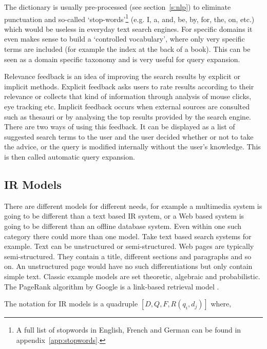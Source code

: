 
The dictionary is usually pre-processed (see section~\ref{s:nlp}) to eliminate punctuation and so-called `stop-words'\footnote{A full list of stopwords in English, French and German can be found in appendix~\ref{app:stopwords}.} (e.g. I, a, and, be, by, for, the, on, etc.) which would be useless in everyday text search engines. For specific domains it even makes sense to build a `controlled vocabulary', where only very specific terms are included (for example the index at the back of a book). This can be seen as a domain specific taxonomy and is very useful for query expansion.

Relevance feedback is an idea of improving the search results by explicit or implicit methods. Explicit feedback asks users to rate results according to their relevance or collects that kind of information through analysis of mouse clicks, eye tracking etc. Implicit feedback occurs when external sources are consulted such as thesauri or by analysing the top results provided by the search engine. There are two ways of using this feedback. It can be displayed as a list of suggested search terms to the user and the user decided whether or not to take the advice, or the query is modified internally without the user's knowledge. This is then called automatic query expansion.


\subsection{IR Models}
\label{s:irmodels}

There are different models for different needs, for example a multimedia system is going to be different than a text based \ac{IR} system, or a Web based system is going to be different than an offline database system. Even within one such category there could more than one model. Take text based search systems for example. Text can be unstructured or semi-structured. Web pages are typically semi-structured. They contain a title, different sections and paragraphs and so on. An unstructured page would have no such differentiations but only contain simple text.  Classic example models are set theoretic, algebraic and probabilistic. The PageRank algorithm by Google is a link-based retrieval model \autocite{Brin1998}.

The notation for \ac{IR} models is a quadruple $[D,Q,F,R(q_i, d_j)]$ \autocite[adapted from][p.58]{Baeza-Yates2011} where,

